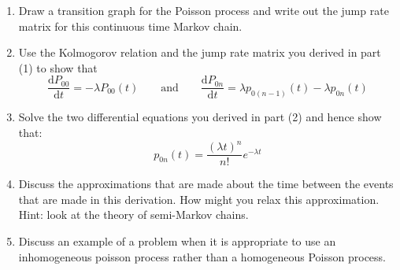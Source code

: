 \documentclass[a4paper]{article}
\begin{document}
\begin{enumerate}
 \item Draw a transition graph for the Poisson process and write out the jump rate matrix for this continuous time Markov chain.
 \item Use the Kolmogorov relation and the jump rate matrix you derived in part (1) to show that 
 $$
  \frac{\textrm{d}P_{00}}{\textrm{d}t} = -\lambda P_{00}(t) \qquad \textrm{and} \qquad \frac{\textrm{d}P_{0n}}{\textrm{d}t} = \lambda p_{0(n-1)}(t) - \lambda p_{0n}(t)
 $$
 \item Solve the two differential equations you derived in part (2) and hence show that:
  $$
   p_{0n}(t) = \frac{(\lambda t)^n}{n!} e^{-\lambda t}
  $$
 \item Discuss the approximations that are made about the time between the events that are made in this derivation.  How might you relax this approximation.  Hint: look at the theory of semi-Markov 
chains.

 \item Discuss an example of a problem when it is appropriate to use an inhomogeneous poisson process rather than a homogeneous Poisson process.
\end{enumerate}
\end{document}
